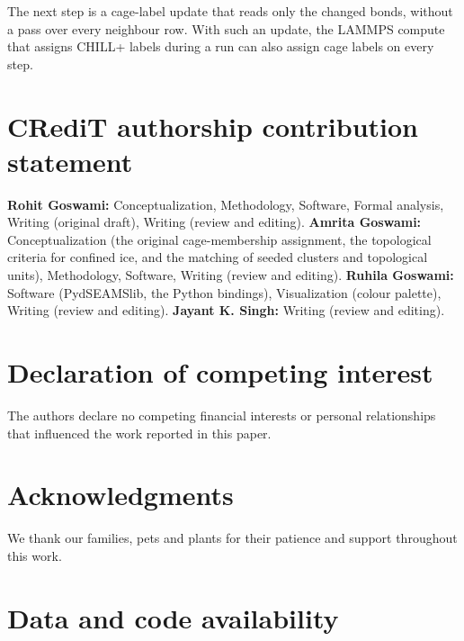 \documentclass[preprint,12pt]{elsarticle}
\begin{document}
The next step is a cage-label update that reads only the changed bonds, without a pass over every neighbour row.
With such an update, the LAMMPS compute that assigns CHILL+ labels during a run can also assign cage labels on every step.

\section*{CRediT authorship contribution statement}

\textbf{Rohit Goswami:} Conceptualization, Methodology, Software, Formal analysis, Writing (original draft), Writing (review and editing).
\textbf{Amrita Goswami:} Conceptualization (the original cage-membership assignment, the topological criteria for confined ice, and the matching of seeded clusters and topological units), Methodology, Software, Writing (review and editing).
\textbf{Ruhila Goswami:} Software (PydSEAMSlib, the Python bindings), Visualization (colour palette), Writing (review and editing).
\textbf{Jayant K. Singh:} Writing (review and editing).

\section*{Declaration of competing interest}

The authors declare no competing financial interests or personal relationships that influenced the work reported in this paper.

\section*{Acknowledgments}

We thank our families, pets and plants for their patience and support throughout this work.

\section*{Data and code availability}
\end{document}
